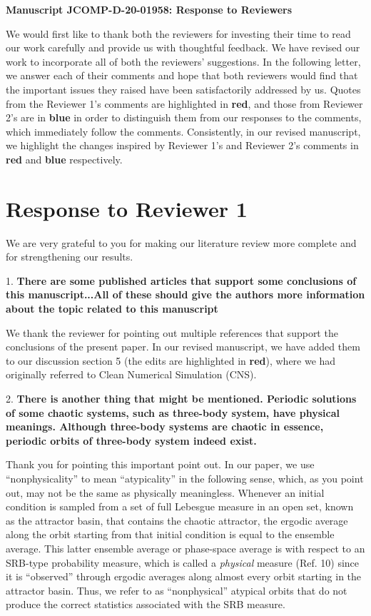 \documentclass[11pt]{article}
\title{}
\author{}
\date{30th October 2020}
\newcommand{\reviewerOne}[1]{{\color{burgundy}\textbf{#1}}}
\newcommand{\reviewerTwo}[1]{{\color{azure}\textbf{#1}}}
\begin{document}
\begin{center}
		\Large{\textbf{Manuscript JCOMP-D-20-01958: Response to Reviewers}}
\end{center}
\medskip
We would first like to thank both the reviewers for investing their time to read our work carefully and provide us with thoughtful feedback. We have revised our work to incorporate all of both the reviewers' suggestions. In the following letter, we answer each of their comments and hope that both reviewers would find that the 
important issues they raised have been satisfactorily addressed by us.
Quotes from the Reviewer 1's comments are highlighted in \reviewerOne{red}, and those from Reviewer 2's are in \reviewerTwo{blue} in order to distinguish them from our responses to the comments, which immediately follow the comments. Consistently, in our revised manuscript, we highlight the changes inspired by Reviewer 1's and Reviewer 2's comments in \reviewerOne{red} and \reviewerTwo{blue} respectively.
\section{Response to Reviewer 1}
We are very grateful to you for making our literature review more complete and for strengthening our results.

1. \reviewerOne{There are some published articles that support some conclusions of this manuscript...All of these should give the authors more information about the topic related to this manuscript}

We thank the reviewer for pointing out multiple references that support the conclusions of the present paper. In our revised manuscript, we have added them to our discussion section 5 (the edits are highlighted in \reviewerOne{red}), where we had originally referred to Clean Numerical Simulation (CNS).


2. \reviewerOne{There is another thing that might be mentioned.  Periodic solutions of some chaotic systems, such as three-body system, have physical meanings.  Although three-body systems are chaotic in essence, periodic orbits of three-body system indeed exist.}

Thank you for pointing this important point out. In our paper, we use ``nonphysicality'' to mean ``atypicality'' in the following sense, which, as you point out, may not be the same as physically meaningless. Whenever an initial condition is sampled from a set of full Lebesgue measure in an open set, known as the attractor basin, that contains the chaotic attractor, the ergodic average along the orbit starting from that initial condition is equal to the ensemble average. This latter ensemble average or phase-space average is with respect to an SRB-type probability measure, which is called a {\em physical} measure (Ref. 10) since it is ``observed'' through ergodic averages along almost every orbit starting in the attractor basin. Thus, we refer to as ``nonphysical'' atypical orbits that do not produce the correct statistics associated with the SRB measure. 
\end{document}
